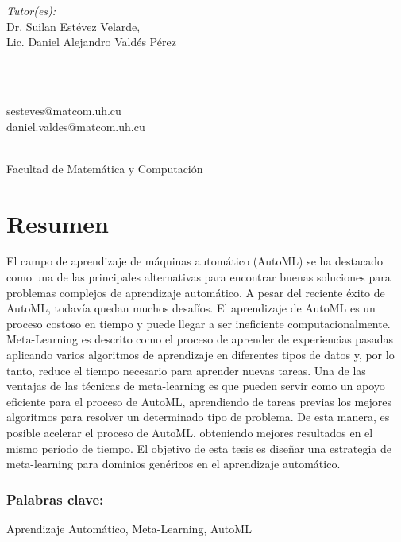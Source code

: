 \documentclass[a4paper,12pt]{article}
\makeatletter
\newcommand{\thetutors}{Dr. Suilan Estévez Velarde, \\ Lic. Daniel Alejandro Valdés Pérez}
\newcommand{\tutormails}{sesteves@matcom.uh.cu \\ daniel.valdes@matcom.uh.cu}
\makeatother
\begin{document}
\begin{titlepage}
	\begin{minipage}{0.4\textwidth}
		\begin{flushleft} \large
			\emph{Tutor(es):}\\
			\thetutors \\
			\end{flushleft}
			\end{minipage}~
			\begin{minipage}{0.4\textwidth}
			\begin{flushright} \large
			\emph{} \\
			\tutormails
		\end{flushright}
	\end{minipage}\\[1 cm]
	
	{\large Facultad de Matemática y Computación}\\[1 cm]
	
 
	\vfill
	
\end{titlepage}


\section*{Resumen}

El campo de aprendizaje de máquinas automático (AutoML) se ha destacado como una de las principales alternativas para encontrar buenas soluciones para problemas complejos de aprendizaje automático. A pesar del reciente éxito de AutoML, todavía quedan muchos desafíos. El aprendizaje de AutoML es un proceso costoso en tiempo y puede llegar a ser ineficiente computacionalmente. Meta-Learning es descrito como el proceso de aprender de experiencias pasadas aplicando varios algoritmos de aprendizaje en diferentes tipos de datos y, por lo tanto, reduce el tiempo necesario para aprender nuevas tareas. Una de las ventajas de las técnicas de meta-learning es que pueden servir como un apoyo eficiente para el proceso de AutoML, aprendiendo de tareas previas los mejores algoritmos para resolver un determinado tipo de problema. De esta manera, es posible acelerar el proceso de AutoML, obteniendo mejores resultados en el mismo período de tiempo. El objetivo de esta tesis es diseñar una estrategia de meta-learning para dominios genéricos en el aprendizaje automático.
\setcounter{page}{0}

\subsubsection*{Palabras clave:}
Aprendizaje Automático, Meta-Learning, AutoML
\end{document}
